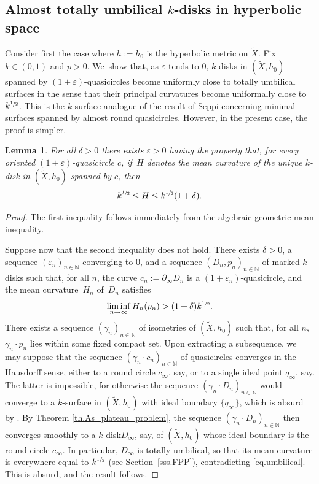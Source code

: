 \documentclass[11pt]{article}
\newcommand{\ksurface}{$k$\nobreakdash-surface\xspace}
\newcommand{\kdisk}{$k$\nobreakdash-disk\xspace}
\newcommand{\kdisks}{$k$\nobreakdash-disks\xspace}
\theoremstyle{plain}
\newtheorem{lemma}[theorem]{Lemma}
\theoremstyle{definition}
\newcommand{\N}{{\mathbb N}}
\let\eps\varepsilon
\newcommand{\bord}{\partial_{\infty}}
\begin{document}
\subsection{Almost totally umbilical \kdisks in hyperbolic space}\label{ss.totally_umb} Consider first the case where $h:=h_0$ is the hyperbolic metric on $\tilde{X}$. Fix $k\in(0,1)$ and $p>0$. We~show that, as $\eps$ tends to $0$, \kdisks in $(\tilde{X},h_0)$ spanned by $(1+\eps)$-quasicircles become uniformly close to totally umbilical surfaces in the sense that their principal curvatures become uniformally close to $k^{\sfrac{1}{2}}$. This is the \ksurface analogue of the result \cite{Seppi} of Seppi concerning minimal surfaces spanned by almost round quasicircles. However, in the present case, the proof is simpler.

\begin{lemma}\label{l.almost_tot_umbilical}
For all $\delta>0$ there exists $\eps>0$ having the property that, for every oriented $(1+\eps)$-quasicircle $c$, if~$H$ denotes the mean curvature of the unique \kdisk in $(\tilde{X},h_0)$ spanned by $c$, then
\begin{equation*}
k^{\sfrac{1}{2}}\leq H\leq k^{\sfrac{1}{2}}(1+\delta).
\end{equation*}
\end{lemma}

\begin{proof}
The first inequality follows immediately from the algebraic-geometric mean inequality.

Suppose now that the second inequality does not hold. There exists $\delta>0$, a sequence $(\eps_n)_{n\in\N}$ converging to $0$, and a sequence $(D_n,p_n)_{n\in\N}$ of marked \kdisks such that, for all $n$, the curve $c_n:=\bord D_n$ is a $(1+\eps_n)$-quasicircle, and the mean curvature~$H_n$ of~$D_n$ satisfies
\begin{equation}\label{eq.umbilical}
\liminf_{n\to\infty} H_n(p_n)>(1+\delta)k^{\sfrac{1}{2}}.
\end{equation}
There exists a sequence $(\gamma_n)_{n\in\N}$ of isometries of $(\tilde{X},h_0)$ such that, for all $n$, $\gamma_n\cdot p_n$ lies within some fixed compact set. Upon extracting a subsequence, we may suppose that the sequence $(\gamma_n\cdot c_n)_{n\in\N}$ of quasicircles converges in the Hausdorff sense, either to a round circle $c_\infty$, say, or to a single ideal point $q_\infty$, say. The latter is impossible, for otherwise the sequence $(\gamma_n\cdot D_n)_{n\in\N}$ would converge to a \ksurface in $(\tilde{X},h_0)$ with ideal boundary $\{q_\infty\}$, which is absurd by \cite[Prop.\,2.5.3]{LabourieInvent}. By Theorem \ref{th.As_plateau_problem}, the sequence $(\gamma_n\cdot D_n)_{n\in\N}$ then converges smoothly to a \kdisk $D_\infty$, say, of $(\tilde{X},h_0)$ whose ideal boundary is the round circle $c_\infty$. In particular, $D_\infty$ is totally umbilical, so that its mean curvature is everywhere equal to $k^{\sfrac{1}{2}}$ (see Section~\ref{sss.FPP}), contradicting \eqref{eq.umbilical}. This is absurd, and the result follows.
\end{proof}
\end{document}

